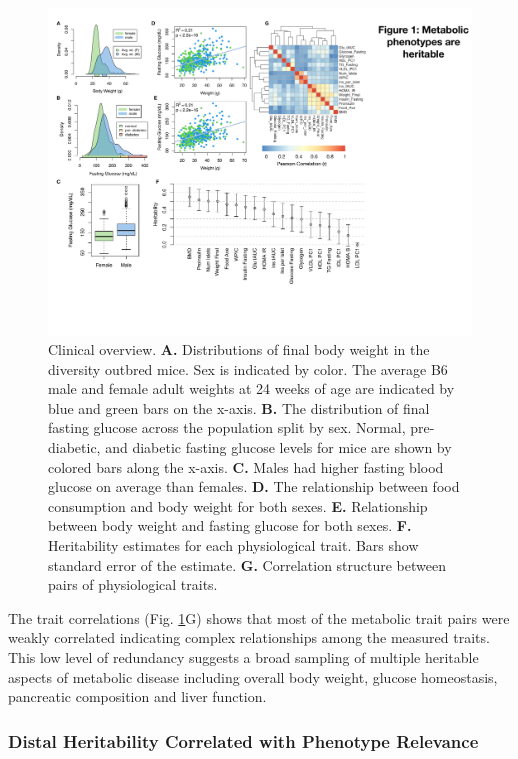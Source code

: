 \documentclass[
]{article}
\begin{document}
\begin{figure}[ht!]
\includegraphics[width=\textwidth]{Figures/Fig1_trait_overview.pdf} 
\caption{Clinical overview. \textbf{A.} Distributions of final body weight 
in the diversity outbred mice. Sex is indicated by color. The 
average B6 male and female adult weights at 24 weeks of age 
are indicated by blue and green bars on the x-axis. \textbf{B.} The 
distribution of final fasting glucose across the population split 
by sex. Normal, pre-diabetic, and diabetic fasting glucose levels 
for mice are shown by colored bars along the x-axis. \textbf{C.} Males had 
higher fasting blood glucose on average than females. \textbf{D.} The 
relationship between food consumption and body weight for both 
sexes. \textbf{E.} Relationship between body weight and fasting glucose 
for both sexes. \textbf{F.} Heritability estimates for each physiological 
trait. Bars show standard error of the estimate. \textbf{G.} Correlation 
structure between pairs of physiological traits.}
\label{fig:trait_overview}
\end{figure}

The trait correlations (Fig. \ref{fig:trait_overview}G) shows that most
of the metabolic trait pairs were weakly correlated indicating complex
relationships among the measured traits. This low level of redundancy
suggests a broad sampling of multiple heritable aspects of metabolic
disease including overall body weight, glucose homeostasis, pancreatic
composition and liver function.

\subsubsection{Distal Heritability Correlated with Phenotype
Relevance}\label{distal-heritability-correlated-with-phenotype-relevance}
\end{document}
